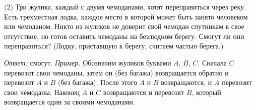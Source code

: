 \textsf{(2)}
Три жулика, каждый с двумя чемоданами, хотят переправиться через реку.
Есть трехместная лодка, каждое место в которой может быть занято человеком или
чемоданом.
Никто из жуликов не доверит свой чемодан спутникам в свое отсутствие, но готов
оставить чемоданы на безлюдном берегу.
Смогут ли они переправиться?
(Лодку, приставшую к берегу, считаем частью берега.)

\solution
\emph{Ответ:} смогут.
\emph{Пример.}
Обозначим жуликов буквами $A$, $B$, $C$.
Сначала $C$ перевозит свои чемоданы, затем он (без багажа) возвращается обратно
и перевозит $A$ и $B$ (без багажа).
После этого $A$ и $B$ возвращаются, и $A$ перевозит свои чемоданы.
Наконец $A$ и $C$ возвращаются и перевозят $B$, который возвращается один за
своими чемоданами.

